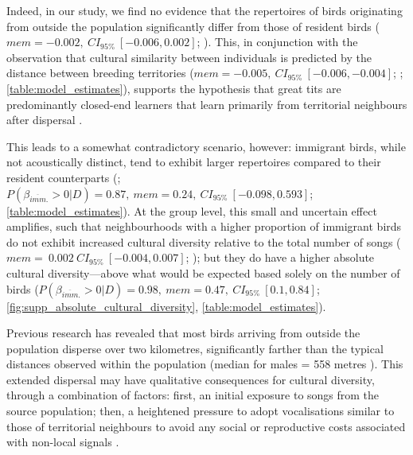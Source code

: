 \documentclass[9pt, twocolumn, twoside]{gsajnl}
\begin{document}
Indeed, in our study, we find no evidence that the repertoires of birds originating from outside the population significantly differ from those of resident birds ($mem = -0.002,~CI_{95\%}~[-0.006, 0.002]$; ). This, in conjunction with the observation that cultural similarity between individuals is predicted by the distance between breeding territories ($mem = -0.005,~CI_{95\%}~[-0.006, -0.004]$; ; \autoref{table:model_estimates}), supports the hypothesis that great tits are predominantly closed-end learners that learn primarily from territorial neighbours after dispersal \parencite{mcgregor1982b, rivera-gutierrez2011, graham2017}.

This leads to a somewhat contradictory scenario, however: immigrant birds, while not acoustically distinct, tend to exhibit larger repertoires compared to their resident counterparts (; $P(\beta_{\overline{imm}.} > 0 | D) = 0.87,~mem=0.24,~CI_{95\%}~[-0.098, 0.593]$; \autoref{table:model_estimates}). At the group level, this small and uncertain effect amplifies, such that neighbourhoods with a higher proportion of immigrant birds do not exhibit increased cultural diversity relative to the total number of songs ($mem=~0.002~CI_{95\%}~[-0.004, 0.007]$; ); but they do have a higher absolute cultural diversity---above what would be expected based solely on the number of birds ($P(\beta_{\overline{imm}.} > 0 | D) = 0.98,~mem=0.47,~CI_{95\%}~[0.1, 0.84]$; \autoref{fig:supp_absolute_cultural_diversity}, \autoref{table:model_estimates}). 

Previous research \parencite{verhulst1997} has revealed that most birds arriving from outside the population disperse over two kilometres, significantly farther than the typical distances observed within the population (median for males = 558 metres \parencite{greenwood1979}). This extended dispersal may have qualitative consequences for cultural diversity, through a combination of factors: first, an initial exposure to songs from the source population; then, a heightened pressure to adopt vocalisations similar to those of territorial neighbours to avoid any social or reproductive costs associated with non-local signals \parencite{payne1983, baker1981, mortega2014, lachlan2014, beecher2008}.
\end{document}
